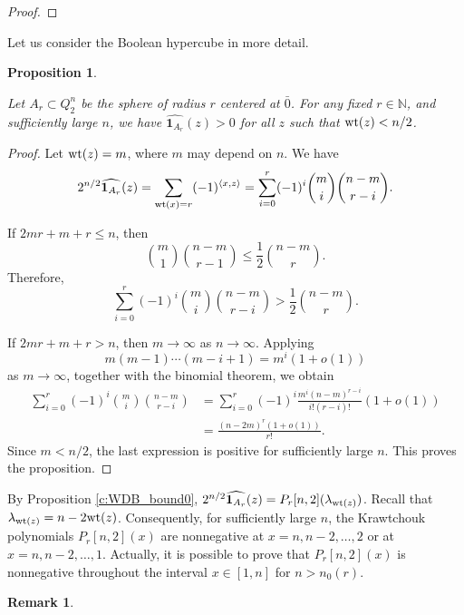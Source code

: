 \documentclass[11pt]{article}
\newtheorem{claim}{Proposition}[section]
\theoremstyle{definition}
\newtheorem{remark}{Remark}[section]
\newcommand{\wt}{{\rm wt}}
\begin{document}
{{{\begin{proof}
\end{proof}

Let us consider the Boolean hypercube  in more detail.

\begin{claim}\label{cl:spher}

Let $A_r\subset Q^n_2$ be the sphere of radius $r$ centered at
$\bar 0$. For any fixed $r\in\mathbb{N}$, and sufficiently large $n$,
we have
$
\widehat{{\mathbf 1}_{A_r}}(z)>0
$
for all $z$ such that $\wt(z)<n/2$.

\end{claim}

\begin{proof}

Let $\wt(z)=m$, where $m$ may depend on $n$. We have
\[
2^{n/2}\widehat{{\mathbf 1}_{A_r}}(z)
=
\sum_{\wt(x)=r}(-1)^{\langle x,z\rangle}
=
\sum_{i=0}^r
(-1)^i
{m\choose i}
{{n-m}\choose {r-i}}.
\]

If
$2mr+m+r\leq n$,
then
\[
{m\choose 1}{{n-m}\choose {r-1}}
\leq
\frac12{{n-m}\choose r}.
\]
Therefore,
\[
\sum_{i=0}^r
(-1)^i
{m\choose i}
{{n-m}\choose {r-i}}
>
\frac12{{n-m}\choose r}.
\]

If
$
2mr+m+r>n$,
then $m\to\infty$ as $n\to\infty$. Applying
\[
m(m-1)\cdots(m-i+1)=m^i(1+o(1))
\]
as $m\to\infty$, together with the binomial theorem, we obtain
\[
\begin{aligned}
\sum_{i=0}^r
(-1)^i
{m\choose i}
{{n-m}\choose {r-i}}
&=
\sum_{i=0}^r
(-1)^i
\frac{m^i(n-m)^{r-i}}{i!(r-i)!}(1+o(1))\\
&=
\frac{(n-2m)^r(1+o(1))}{r!}.
\end{aligned}
\]
Since $m<n/2$, the last expression is positive for sufficiently
large $n$. This proves the proposition.

\end{proof}

By Proposition \ref{c:WDB_bound0},
$
2^{n/2}\widehat{{\mathbf 1}_{A_r}}(z)
=
P_r[n,2](\lambda_{\wt(z)})$. Recall that $\lambda_{\wt(z)}= n-2\wt(z)$.
Consequently, for sufficiently large $n$, the Krawtchouk polynomials
$P_r[n,2](x)$ are nonnegative at
$x=n,n-2,\dots,2$ 
or at
$x=n,n-2,\dots,1$.
Actually,
it is possible to prove that $P_r[n,2](x)$ is nonnegative throughout the interval
$x\in[1,n]$ for $n>n_0(r)$.

\begin{remark}\label{lastremark}


\end{remark}}}}
\end{document}
